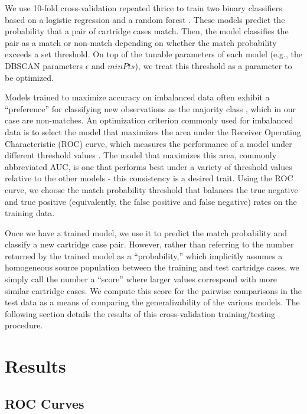 \documentclass[11pt,]{isuthesis}
\begin{document}
We use 10-fold cross-validation repeated thrice \citep{caret} to train two binary classifiers based on a logistic regression and a random forest \citep{breiman, randomForest}.
These models predict the probability that a pair of cartridge cases match.
Then, the model classifies the pair as a match or non-match depending on whether the match probability exceeds a set threshold.
On top of the tunable parameters of each model (e.g., the DBSCAN parameters \(\epsilon\) and \(minPts\)), we treat this threshold as a parameter to be optimized.

Models trained to maximize accuracy on imbalanced data often exhibit a ``preference'' for classifying new observations as the majority class \citep{Fernndez2018}, which in our case are non-matches.
An optimization criterion commonly used for imbalanced data is to select the model that maximizes the area under the Receiver Operating Characteristic (ROC) curve, which measures the performance of a model under different threshold values \citep{James2013}.
The model that maximizes this area, commonly abbreviated AUC, is one that performs best under a variety of threshold values relative to the other models - this consistency is a desired trait.
Using the ROC curve, we choose the match probability threshold that balances the true negative and true positive (equivalently, the false positive and false negative) rates on the training data.

Once we have a trained model, we use it to predict the match probability and classify a new cartridge case pair.
However, rather than referring to the number returned by the trained model as a ``probability,'' which implicitly assumes a homogeneous source population between the training and test cartridge cases, we simply call the number a ``score'' where larger values correspond with more similar cartridge cases.
We compute this score for the pairwise comparisons in the test data as a means of comparing the generalizability of the various models.
The following section details the results of this cross-validation training/testing procedure.

\hypertarget{results}{%
\section{Results}\label{results}}

\hypertarget{roc-curves}{%
\subsection{ROC Curves}\label{roc-curves}}
\end{document}
